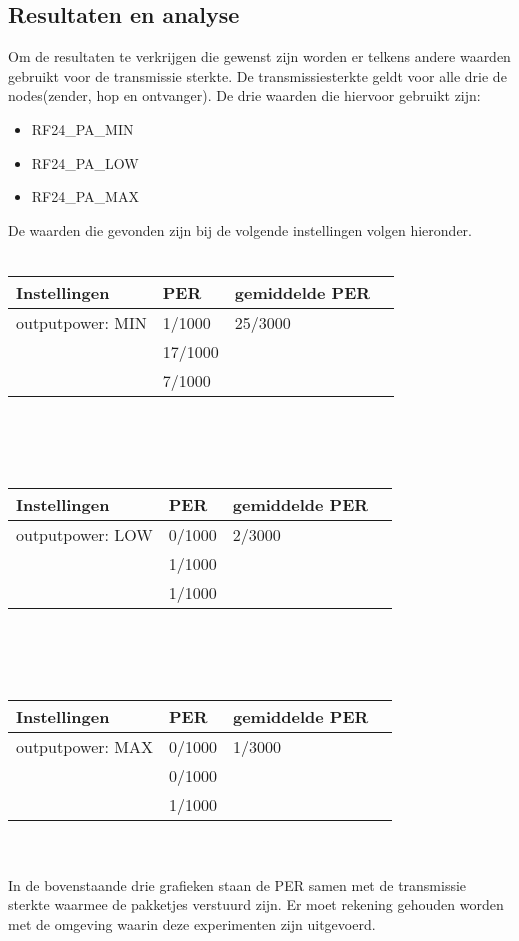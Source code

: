\documentclass{article}
\begin{document}
\subsection{Resultaten en analyse}

Om de resultaten te verkrijgen die gewenst zijn worden er telkens andere waarden gebruikt voor de transmissie sterkte.
De transmissiesterkte geldt voor alle drie de nodes(zender, hop en ontvanger). De drie waarden die hiervoor gebruikt zijn:

\begin{itemize}
	\item RF24\_PA\_MIN
	\item RF24\_PA\_LOW
	\item RF24\_PA\_MAX
\end{itemize}
De waarden die gevonden zijn bij de volgende instellingen volgen hieronder.
\\
\\
    \begin{tabular}{ | l | l | l | p{5cm} |}
    \hline
    Instellingen 				& PER 		& gemiddelde PER\\ \hline
    outputpower: MIN 			& 1/1000 	& 25/3000		\\
    							& 17/1000 	& 				\\
   								& 7/1000	&  				\\ \hline
    \end{tabular}\\
\\
\\
    \begin{tabular}{ | l | l | l | p{5cm} |}
    \hline
    Instellingen 				& PER 		& gemiddelde PER\\ \hline
    outputpower: LOW 			& 0/1000 	& 2/3000		\\
    							& 1/1000 	& 				\\
   								& 1/1000	&  				\\ \hline
    \end{tabular}\\
\\
\\
    \begin{tabular}{ | l | l | l | p{5cm} |}
    \hline
    Instellingen 				& PER 		& gemiddelde PER\\ \hline
    outputpower: MAX 			& 0/1000 	& 1/3000		\\
    							& 0/1000 	& 				\\
   								& 1/1000	&  				\\ \hline
    \end{tabular}\\
\\
In de bovenstaande drie grafieken staan de PER samen met de transmissie sterkte waarmee de pakketjes verstuurd zijn. Er moet rekening gehouden worden met de omgeving waarin deze experimenten zijn uitgevoerd. 
\end{document}
